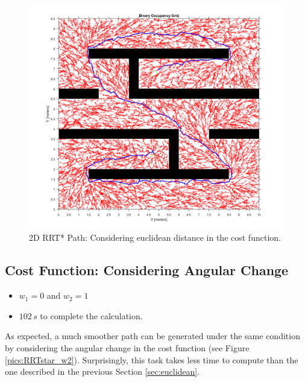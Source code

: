\begin{figure} [h]
	\centering
	\includegraphics[width=1\textwidth]{images/RRTstar_w1.png}
	\caption{2D RRT* Path: Considering euclidean distance in the cost function.}
	\label{pics:RRTstar_w1}
\end{figure}


\subsection{Cost Function: Considering Angular Change}

\begin{itemize}
	\item
	$w_{1}=0$ and $w_{2}=1$
	\item
	$102\,s$ to complete the calculation.
\end{itemize}

As expected, a much smoother path can be generated under the same condition by considering the angular change in the cost function (see Figure  \ref{pics:RRTstar_w2}). Surprisingly, this task takes less time to compute than the one described in the previous Section  \ref{sec:euclidean}.

